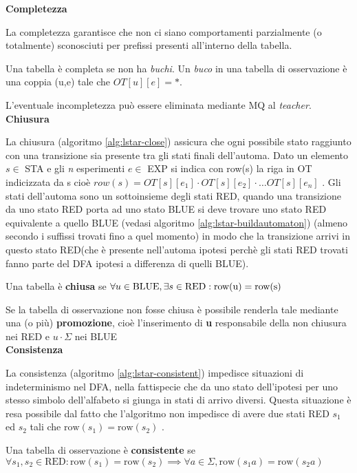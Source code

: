 {\large\textbf{Completezza}}

La completezza garantisce che non ci siano comportamenti parzialmente (o totalmente) sconosciuti per prefissi presenti all'interno della tabella.
\begin{definizione*} Una tabella è completa se non ha \textit{buchi}. Un \textit{buco} in una tabella di osservazione è una coppia (u,e) tale che $OT[u][e] = *$.
\end{definizione*}
L'eventuale incompletezza può essere eliminata mediante \ac{MQ} al \textit{teacher}.\\

{\large\textbf{Chiusura}}

La chiusura (algoritmo \ref{alg:lstar-close}) assicura che ogni possibile stato raggiunto con una transizione sia presente tra gli stati finali dell'automa. Dato un elemento $s \in$ STA e gli \textit{n} esperimenti $e \in $ EXP si indica con row(s) la riga in OT indicizzata da s cioè $row(s)=OT[s][e_1] \cdot OT[s][e_2] \cdot \dots OT[s][e_n]$ . Gli stati dell'automa sono un sottoinsieme degli stati RED, quando una transizione da uno stato RED porta ad uno stato BLUE  si deve trovare uno stato RED equivalente a quello BLUE (vedasi algoritmo \ref{alg:lstar-buildautomaton}) (almeno secondo i suffissi trovati fino a quel momento) in modo che la transizione arrivi in questo stato RED(che è presente nell'automa ipotesi perchè gli stati RED trovati fanno parte del \ac{DFA} ipotesi a differenza di quelli BLUE).
\begin{definizione*} Una tabella è \textbf{chiusa} se $\forall u \in \text{BLUE}, \exists s\\ \in \text{RED} : \text{row(u)} = \text{row(s)}$
\end{definizione*}
Se la tabella di osservazione non fosse chiusa è possibile renderla tale mediante una (o più) \textbf{promozione}, cioè l'inserimento di \textbf{u} responsabile della non chiusura nei RED e $u \cdot \Sigma$ nei BLUE\\

{\large\textbf{Consistenza}}

La consistenza  (algoritmo \ref{alg:lstar-consistent}) impedisce situazioni di indeterminismo nel DFA, nella fattispecie che da uno stato dell'ipotesi per uno stesso simbolo dell'alfabeto si giunga in stati di arrivo diversi. Questa situazione è resa possibile dal fatto che l'algoritmo non impedisce di avere due stati RED $s_1$ ed $s_2$ tali che $\text{row}(s_1) = \text{row}(s_2)$ . 
\begin{definizione*}Una tabella di osservazione è \textbf{consistente} se $\forall s_1,s_2 \in \text{RED} : \text{row}(s_1)=\text{row}(s_2)\implies\forall a \in \Sigma,\text{row}(s_1a)=\text{row}(s_2a)$
\end{definizione*} 

